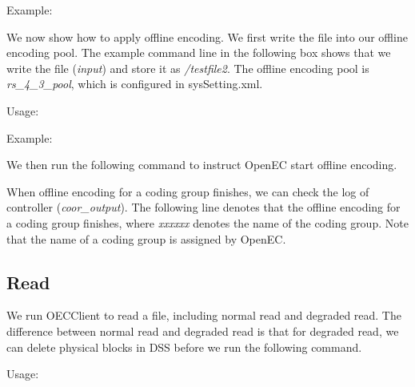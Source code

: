 \documentclass[letterpaper,12pt]{article}
\newcommand{\openec}{{\sf\small OpenEC}\xspace}
\begin{document}
Example:
\begin{center}
\noindent{}
\end{center}

We now show how to apply offline encoding. We first write the file into our offline encoding pool.
The example command line in the following box shows that we write the file ({\sl input}) and store
it as {\sl /testfile2}. The offline encoding pool is {\sl rs\_4\_3\_pool}, which is configured in sysSetting.xml.

Usage:
\begin{center}
\noindent{}
\end{center}

Example:
\begin{center}
\noindent{}
\end{center}

We then run the following command to instruct \openec start offline encoding.

\begin{center}
\noindent{}
\end{center}

When offline encoding for a coding group finishes, we can check the log of controller ({\sl coor\_output}).
The following line denotes that the offline encoding for a coding group finishes, where {\sl xxxxxx} denotes
the name of the coding group. Note that the name of a coding group is assigned by \openec.

\begin{center}
\noindent{}
\end{center}


\subsection{Read}

We run OECClient to read a file, including normal read and degraded read. 
The difference between normal read and degraded read is that for degraded read, we
can delete physical blocks in DSS before we run the following command.

Usage:
\begin{center}
\noindent{}
\end{center}
\end{document}
